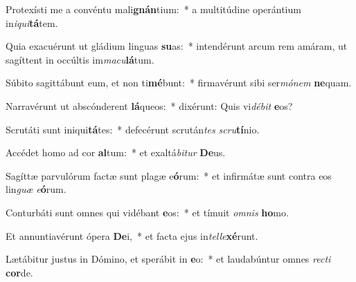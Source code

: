 \item Protexísti me a convéntu mali\textbf{gnán}tium:~* a multitúdine operántium in\textit{i}\textit{qui}\textbf{tá}tem.
\item Quia exacuérunt ut gládium linguas \textbf{su}as:~* intendérunt arcum rem amáram, ut sagíttent in occúltis im\textit{ma}\textit{cu}\textbf{lá}tum.
\item Súbito sagittábunt eum, et non ti\textbf{mé}bunt:~* firmavérunt sibi ser\textit{mó}\textit{nem} \textbf{ne}quam.
\item Narravérunt ut abscónderent \textbf{lá}queos:~* dixérunt: Quis vi\textit{dé}\textit{bit} \textbf{e}os?
\item Scrutáti sunt iniqui\textbf{tá}tes:~* defecérunt scrután\textit{tes} \textit{scru}\textbf{tí}nio.
\item Accédet homo ad cor \textbf{al}tum:~* et exaltá\textit{bi}\textit{tur} \textbf{De}us.
\item Sagíttæ parvulórum factæ sunt plagæ e\textbf{ó}rum:~* et infirmátæ sunt contra eos lin\textit{guæ} \textit{e}\textbf{ó}rum.
\item Conturbáti sunt omnes qui vidébant \textbf{e}os:~* et tímuit \textit{om}\textit{nis} \textbf{ho}mo.
\item Et annuntiavérunt ópera \textbf{De}i,~* et facta ejus in\textit{tel}\textit{le}\textbf{xé}runt.
\item Lætábitur justus in Dómino, et sperábit in \textbf{e}o:~* et laudabúntur omnes \textit{rec}\textit{ti} \textbf{cor}de.
